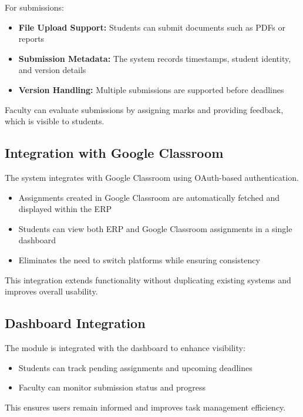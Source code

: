 For submissions:

\begin{itemize}
    \item \textbf{File Upload Support:} Students can submit documents such as PDFs or reports
    \item \textbf{Submission Metadata:} The system records timestamps, student identity, and version details
    \item \textbf{Version Handling:} Multiple submissions are supported before deadlines
\end{itemize}

Faculty can evaluate submissions by assigning marks and providing feedback, which is visible to
students.

\subsection{Integration with Google Classroom}

The system integrates with Google Classroom using OAuth-based authentication.

\begin{itemize}
    \item Assignments created in Google Classroom are automatically fetched and displayed within
    the ERP
    \item Students can view both ERP and Google Classroom assignments in a single dashboard
    \item Eliminates the need to switch platforms while ensuring consistency
\end{itemize}

This integration extends functionality without duplicating existing systems and improves overall
usability.

\subsection{Dashboard Integration}

The module is integrated with the dashboard to enhance visibility:

\begin{itemize}
    \item Students can track pending assignments and upcoming deadlines
    \item Faculty can monitor submission status and progress
\end{itemize}

This ensures users remain informed and improves task management efficiency.

